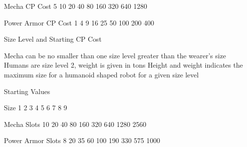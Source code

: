 \documentclass[twoside]{book}
\begin{document}
                      
                       Mecha CP Cost   
                       5   
                       10   
                       20   
                       40   
                       80   
                       160   
                       320   
                       640   
                       1280   
                      
                      
                       Power Armor CP Cost   
                       1   
                       4   
                       9   
                       16   
                       25   
                       50   
                       100   
                       200   
                       400   
                      
                    
                  Size Level and Starting CP Cost  
                  
                  
                     Mecha can be no smaller than one size level
                     greater than the wearer's size 
                     Humans are size level 2, weight is given in
                     tons 
                     Height and weight indicates the maximum size
                     for a humanoid shaped robot for a given size level
                     
                  
                
                
                Starting Values  
                  
                    
                      
                       Size   
                       1 
                       2 
                       3   
                       4 
                       5 
                       6   
                       7 
                       8 
                       9   
                      
                      
                       Mecha Slots   
                       10   
                       20   
                       40   
                       80   
                       160   
                       320   
                       640   
                       1280   
                       2560   
                      
                      
                       Power Armor Slots   
                       8   
                       20   
                       35   
                       60   
                       100   
                       190   
                       330   
                       575   
                       1000   
                      
\end{document}
